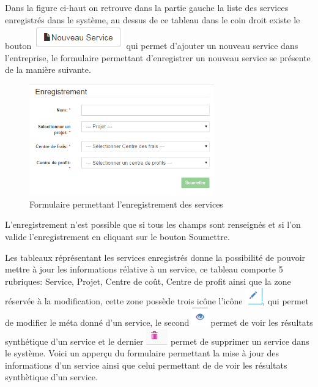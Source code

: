 \documentclass[12pt,a4paper]{report}
\begin{document}
Dans la figure ci-haut on retrouve dans la partie gauche la liste des services enregistrés dans le système, au dessus de ce tableau dans le coin droit existe le bouton \includegraphics[scale=1]{pic/NewService.png} qui permet d'ajouter un nouveau service dans l'entreprise, le formulaire permettant d'enregistrer un nouveau service se présente de la manière suivante.

\begin{figure}[h]
\begin{center}
\includegraphics[width=8cm]{pic/ServiceSave.png}
\end{center}
\caption{Formulaire permettant l'enregistrement des services}
\label{Formulaire permettant l'enregistrement des services}
\end{figure} 

L'enregistrement n'est possible que si tous les champs sont renseignés et si l'on valide l'enregistrement en cliquant sur le bouton Soumettre. 

Les tableaux réprésentant les services enregistrés donne la possibilité de pouvoir mettre à jour les informations rélative à un service, ce tableau comporte 5 rubriques: Service, Projet, Centre de coût, Centre de profit ainsi que la zone réservée à la modification, cette zone possède trois icône l'icône \includegraphics[scale=0.7]{pic/EditUser.png}, qui permet de modifier le méta donné d'un service, le second \includegraphics[scale=0.7]{pic/EyesBlue.png} permet de voir les résultats synthétique d'un service et le dernier \includegraphics[scale=0.7]{pic/DeleteWRed.png} permet de supprimer un service dans le système.
\newpage
Voici un apperçu du formulaire permettant la mise à jour des informations d'un service ainsi que celui permettant de de voir les résultats synthètique d'un service.
\end{document}
